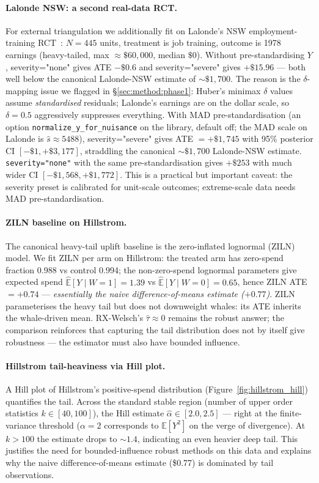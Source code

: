 \paragraph{Lalonde NSW: a second real-data RCT.}
For external triangulation we additionally fit on Lalonde's NSW
employment-training RCT~\citep{lalonde1986evaluating}: $N = 445$
units, treatment is job training, outcome is 1978 earnings
(heavy-tailed, max $\approx \$60{,}000$, median $\$0$). Without
pre-standardising $Y$, severity="none" gives ATE $-\$0.6$ and
severity="severe" gives $+\$15.96$ --- both well below the canonical
Lalonde-NSW estimate of $\sim \$1{,}700$. The reason is the
$\delta$-mapping issue we flagged in \S\ref{sec:method:phase1}:
Huber's minimax $\delta$ values assume \emph{standardised}
residuals; Lalonde's earnings are on the dollar scale, so
$\delta = 0.5$ aggressively suppresses everything. With MAD
pre-standardisation (an option \texttt{normalize\_y\_for\_nuisance}
on the library, default off; the MAD scale on Lalonde is $\hat{s}
\approx 5488$), severity="severe" gives ATE $= +\$1{,}745$ with 95\%
posterior CI $[-\$1, +\$3{,}177]$, straddling the canonical
$\sim\$1{,}700$ Lalonde-NSW estimate. \texttt{severity="none"} with
the same pre-standardisation gives $+\$253$ with much wider CI
$[-\$1{,}568, +\$1{,}772]$. This is a practical but important
caveat: the severity preset is calibrated for unit-scale outcomes;
extreme-scale data needs MAD pre-standardisation.

\paragraph{ZILN baseline on Hillstrom.}
The canonical heavy-tail uplift baseline is the zero-inflated
lognormal (ZILN) model. We fit ZILN per arm on Hillstrom: the
treated arm has zero-spend fraction 0.988 vs control 0.994; the
non-zero-spend lognormal parameters give expected spend
$\hat{\mathbb{E}}[Y \mid W=1] = 1.39$ vs $\hat{\mathbb{E}}[Y \mid W=0] = 0.65$, hence
ZILN ATE $= +0.74$ --- \emph{essentially the naive
difference-of-means estimate ($+0.77$)}. ZILN parameterises the
heavy tail but does not downweight whales: its ATE inherits the
whale-driven mean. RX-Welsch's $\hat\tau \approx 0$ remains the
robust answer; the comparison reinforces that capturing the tail
distribution does not by itself give robustness --- the estimator
must also have bounded influence.

\paragraph{Hillstrom tail-heaviness via Hill plot.}
A Hill plot of Hillstrom's positive-spend distribution (Figure~\ref{fig:hillstrom_hill})
quantifies the tail. Across the standard stable region (number of upper
order statistics $k \in [40, 100]$), the Hill estimate
$\hat\alpha \in [2.0, 2.5]$ --- right at the finite-variance threshold
($\alpha = 2$ corresponds to $\mathbb{E}[Y^2]$ on the verge of divergence). At
$k > 100$ the estimate drops to $\sim 1.4$, indicating an even heavier
deep tail. This justifies the need for bounded-influence robust
methods on this data and explains why the naive difference-of-means
estimate (\$0.77) is dominated by tail observations.

